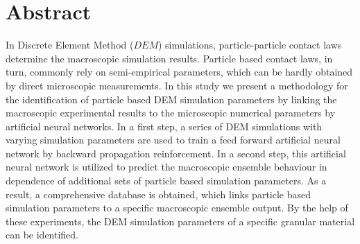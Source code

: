 \section{Abstract}
\label{sec:abstract}

In Discrete Element Method ($DEM$) simulations, particle-particle contact laws
determine the macroscopic simulation results. Particle based contact laws, in
turn, commonly rely on semi-empirical parameters, which can be hardly obtained
by direct microscopic measurements.
In this study we present a methodology for the identification of particle based
DEM simulation parameters by linking the macroscopic experimental results to the
microscopic numerical parameters by artificial neural networks.
In a first step, a series
of DEM simulations with varying simulation parameters are used to train a feed
forward artificial neural network by backward propagation reinforcement. In a
second step, this artificial neural network is utilized to predict the
macroscopic ensemble behaviour in dependence of additional sets of particle
based simulation parameters.
As a result, a comprehensive database is obtained,
which links particle based simulation parameters to a specific macroscopic ensemble output.
By the help of these experiments, the DEM simulation parameters of a specific granular material can be identified.

